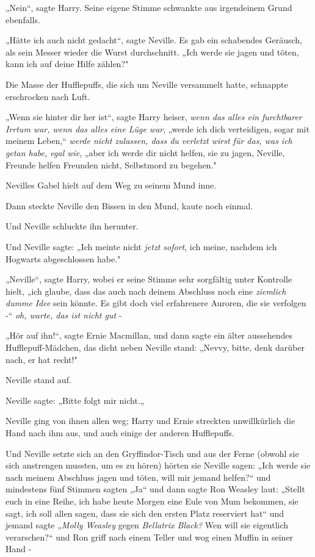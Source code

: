 {„Nein“, sagte Harry. Seine eigene Stimme schwankte aus irgendeinem Grund ebenfalls.

„Hätte ich auch nicht gedacht“, sagte Neville. Es gab ein schabendes Geräusch, als sein Messer wieder die Wurst durchschnitt. „Ich werde sie jagen und töten, kann ich auf deine Hilfe zählen?"

Die Masse der Hufflepuffs, die sich um Neville versammelt hatte, schnappte erschrocken nach Luft.

„Wenn sie hinter dir her ist“, sagte Harry heiser, \emph{wenn das alles ein furchtbarer Irrtum war, wenn das alles eine Lüge war}, „werde ich dich verteidigen, sogar mit meinem Leben,“ \emph{werde nicht zulassen, dass du verletzt wirst für das, was ich getan habe, egal wie}, „aber ich werde dir nicht helfen, sie zu jagen, Neville, Freunde helfen Freunden nicht, Selbstmord zu begehen."

Nevilles Gabel hielt auf dem Weg zu seinem Mund inne.

Dann steckte Neville den Bissen in den Mund, kaute noch einmal.

Und Neville schluckte ihn herunter.

Und Neville sagte: „Ich meinte nicht \emph{jetzt sofort}, ich meine, nachdem ich Hogwarts abgeschlossen habe."

„Neville“, sagte Harry, wobei er seine Stimme sehr sorgfältig unter Kontrolle hielt, „ich glaube, dass das auch nach deinem Abschluss noch eine \emph{ziemlich dumme} \emph{Idee} sein könnte. Es gibt doch viel erfahrenere Auroren, die sie verfolgen -“ \emph{oh, warte, das ist nicht gut} -

„Hör auf ihn!“, sagte Ernie Macmillan, und dann sagte ein älter aussehendes Hufflepuff-Mädchen, das dicht neben Neville stand: „Nevvy, bitte, denk darüber nach, er hat recht!"

Neville stand auf.

Neville sagte: „Bitte folgt mir nicht.„

Neville ging von ihnen allen weg; Harry und Ernie streckten unwillkürlich die Hand nach ihm aus, und auch einige der anderen Hufflepuffs.

Und Neville setzte sich an den Gryffindor-Tisch und aus der Ferne (obwohl sie sich anstrengen mussten, um es zu hören) hörten sie Neville sagen: „Ich werde sie nach meinem Abschluss jagen und töten, will mir jemand helfen?“ und mindestens fünf Stimmen sagten „Ja“ und dann sagte Ron Weasley laut: „Stellt euch in eine Reihe, ich habe heute Morgen eine Eule von Mum bekommen, sie sagt, ich soll allen sagen, dass sie sich den ersten Platz reserviert hat“ und jemand sagte „\emph{Molly Weasley} gegen \emph{Bellatrix Black?} Wen will sie eigentlich verarschen?“ und Ron griff nach einem Teller und wog einen Muffin in seiner Hand -

}
